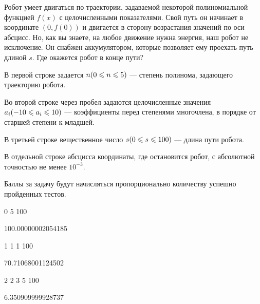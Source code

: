 
Робот умеет двигаться по траектории, задаваемой некоторой полиномиальной функцией $f(x)$ с 
целочисленными показателями. Свой путь он начинает в координате $(0, f(0))$  и двигается в 
сторону возрастания значений по оси абсцисс. Но, как вы знаете, на любое движение нужна 
энергия, наш робот не исключение. Он снабжен аккумулятором, которые позволяет ему 
проехать путь длиной $s$. Где окажется робот в конце пути?  

В первой строке задается $n \space (0 \leq n \leq 5)$  — степень полинома, задающего 
траекторию робота.

Во второй строке через пробел задаются целочисленные значения $a_i \space (-10 \leq a_i \leq 10)$  — 
коэффициенты перед степенями многочлена, в порядке от старшей степени к младшей.

В третьей строке вещественное число $s \space (0 \leq s \leq 100)$  — длина пути робота.

\outputfmtSection
В отдельной строке абсцисса координаты, где остановится робот, с абсолютной точностью не менее $10^{-3}$.

\markSection

Баллы за задачу будут начисляться пропорционально количеству успешно пройденных тестов.


\begin{myverbbox}[\small]{\vinput}
    0
    5
    100
\end{myverbbox}

\begin{myverbbox}[\small]{\voutput}
    100.00000002054185
\end{myverbbox}


\begin{myverbbox}[\small]{\vinput}
    1
    1 1
    100
\end{myverbbox}

\begin{myverbbox}[\small]{\voutput}
    70.71068001124502
\end{myverbbox}


\begin{myverbbox}[\small]{\vinput}
    2
    2 3 5
    100
\end{myverbbox}

\begin{myverbbox}[\small]{\voutput}
    6.350909999928737
\end{myverbbox}

